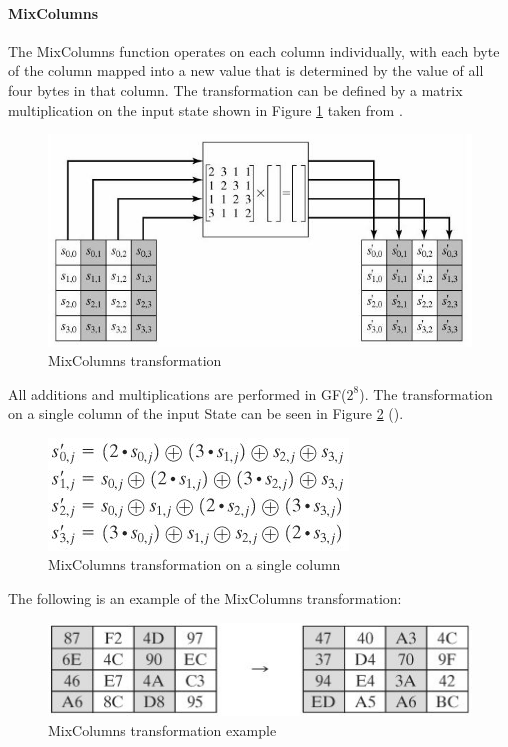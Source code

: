 \documentclass[a4paper,10pt]{report}
\begin{document}
\paragraph{MixColumns}

The MixColumns function operates on each column individually, with each byte of the column mapped into a new value that is determined by the value of all four bytes in that column. The transformation can be defined by a matrix multiplication on the input state shown in Figure \ref{fig:mixcols1} taken from \cite{aesmixcols}.

\begin{figure}[htb]
\centering
\includegraphics[scale=0.6]{images/mixcols1.jpg}
\caption{MixColumns transformation}
\label{fig:mixcols1}
\end{figure}

All additions and multiplications are performed in GF($2^{8}$). The transformation on a single column of the input State can be seen in Figure \ref{fig:mixcols2} (\cite{aesmixcolssecond}).

\begin{figure}[htb]
\centering
\includegraphics[scale=0.7]{images/mixcols2.jpg}
\caption{MixColumns transformation on a single column}
\label{fig:mixcols2}
\end{figure}

The following is an example of the MixColumns transformation:

\begin{figure}[htb]
\centering
\includegraphics[scale=0.7]{images/mixcolsexample.jpg}
\caption{MixColumns transformation example}
\label{fig:mixcolsexample}
\end{figure}
\end{document}
